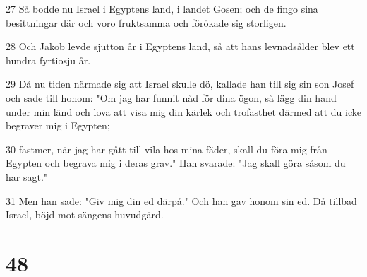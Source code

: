 \par 27 Så bodde nu Israel i Egyptens land, i landet Gosen; och de fingo sina besittningar där och voro fruktsamma och förökade sig storligen.
\par 28 Och Jakob levde sjutton år i Egyptens land, så att hans levnadsålder blev ett hundra fyrtiosju år.
\par 29 Då nu tiden närmade sig att Israel skulle dö, kallade han till sig sin son Josef och sade till honom: "Om jag har funnit nåd för dina ögon, så lägg din hand under min länd och lova att visa mig din kärlek och trofasthet därmed att du icke begraver mig i Egypten;
\par 30 fastmer, när jag har gått till vila hos mina fäder, skall du föra mig från Egypten och begrava mig i deras grav." Han svarade: "Jag skall göra såsom du har sagt."
\par 31 Men han sade: "Giv mig din ed därpå." Och han gav honom sin ed. Då tillbad Israel, böjd mot sängens huvudgärd.

\chapter{48}

